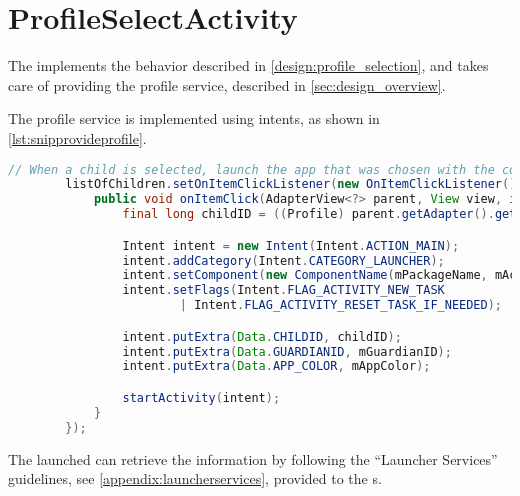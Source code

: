 \section{ProfileSelectActivity}

The  implements the behavior described in \autoref{design:profile_selection}, and takes care of providing the profile service, described in \autoref{sec:design_overview}.

The profile service is implemented using intents, as shown in \autoref{lst:snipprovideprofile}.

\begin{lstlisting}[style=sourceCode, language=JAVA, caption=Code snippet showing the provision of profile data, label=lst:snipprovideprofile]
		// When a child is selected, launch the app that was chosen with the correct data in the extras.
		listOfChildren.setOnItemClickListener(new OnItemClickListener() {
			public void onItemClick(AdapterView<?> parent, View view, int position, long id) {
				final long childID = ((Profile) parent.getAdapter().getItem(position)).getId();

				Intent intent = new Intent(Intent.ACTION_MAIN);
				intent.addCategory(Intent.CATEGORY_LAUNCHER);
				intent.setComponent(new ComponentName(mPackageName, mActivityName));
				intent.setFlags(Intent.FLAG_ACTIVITY_NEW_TASK
						| Intent.FLAG_ACTIVITY_RESET_TASK_IF_NEEDED);

				intent.putExtra(Data.CHILDID, childID);
				intent.putExtra(Data.GUARDIANID, mGuardianID);
				intent.putExtra(Data.APP_COLOR, mAppColor);

				startActivity(intent);
			}
		});
\end{lstlisting}

The launched \girafapp[] can retrieve the information by following the ``Launcher Services'' guidelines, see \autoref{appendix:launcherservices}, provided to the \localgroup[]s.
